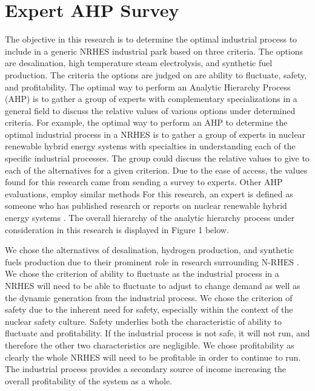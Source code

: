 \documentclass[12pt]{UIdahoMastersThesis}
\begin{document}
\section{Expert AHP Survey}
The objective in this research is to determine the optimal industrial process to include in a generic NRHES industrial park based on three criteria. The options are desalination, high temperature steam electrolysis, and synthetic fuel production. The criteria the options are judged on are ability to fluctuate, safety, and profitability. The optimal way to perform an Analytic Hierarchy Process (AHP) is to gather a group of experts with complementary specializations in a general field to discuss the relative values of various options under determined criteria. For example, the optimal way to perform an AHP to determine the optimal industrial process in a NRHES is to gather a group of experts in nuclear renewable hybrid energy systems with specialties in understanding each of the specific industrial processes. The group could discuss the relative values to give to each of the alternatives for a given criterion. Due to the ease of access, the values found for this research came from sending a survey to experts.  Other AHP evaluations, employ similar methods For this research, an expert is defined as someone who has published research or reports on nuclear renewable hybrid energy systems \cite{Pan2008}. The overall hierarchy of the analytic hierarchy process under consideration in this research is displayed in Figure 1 below.

	We chose the alternatives of desalination, hydrogen production, and synthetic fuels production due to their prominent role in research surrounding N-RHES \cite{Bragg-Sitton2014,Locatelli2015,Kim2016,Bragg-Sitton2016,Garcia2016,Shropshire2011, Ruth2014,Bienvenu2015}.  We chose the criterion of ability to fluctuate as the industrial process in a NRHES will need to be able to fluctuate to adjust to change demand as well as the dynamic generation from the industrial process.  We chose the criterion of safety due to the inherent need for safety, especially within the context of the nuclear safety culture.  Safety underlies both the characteristic of ability to fluctuate and profitability. If the industrial process is not safe, it will not run, and therefore the other two characteristics are negligible. We chose profitability as clearly the whole NRHES will need to be profitable in order to continue to run.  The industrial process provides a secondary source of income  increasing the overall profitability of the system as a whole.
\end{document}
